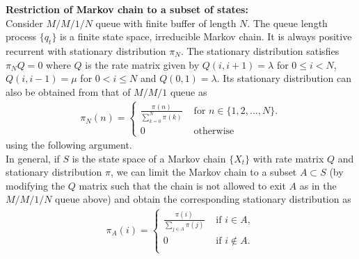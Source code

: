 \documentclass[all-lectures.tex]{subfiles}
\begin{document}
\noindent \textbf{Restriction of Markov chain to a subset of states:} \\
\indent Consider $M/M/1/N$ queue with finite buffer of length $N$. The queue length process $\{q_t\}$ is a finite state space, irreducible Markov chain. It is always positive recurrent with stationary distribution $\pi_N$. The stationary distribution satisfies $\pi_N Q = 0$ where $Q$ is the rate matrix given by $Q(i,i+1) = \lambda$ for $ 0 \leq i < N$, $Q(i,i-1) = \mu$ for $0 < i \leq N$ and $Q(0,1) = \lambda$. Its stationary distribution can also be obtained from that of $M/M/1$ queue as 
\begin{align*}
\pi_{N}(n) = \begin{cases}
	\frac{\pi_{}(n)}{\sum_{k=0}^{N} \pi_{}(k)} & \text{ for } n \in \{1,2,\dots,N\}. \\
	0 & \text{ otherwise}
	\end{cases}
\end{align*}
using the following argument. \\
\indent In general, if $S$ is the state space of a Markov chain $\{X_t\}$ with rate matrix $Q$ and stationary distribution $\pi$, we can limit the Markov chain to a subset $A \subset S$ (by modifying the $Q$ matrix such that the chain is not allowed to exit $A$ as in the $M/M/1/N$ queue above) and obtain the corresponding stationary distribution as 
\begin{align*}
\pi_A(i) = \begin{cases} 
			\frac{\pi(i)}{\sum_{j \in A} \pi(j)} & \text{ if } i \in A, \\
			0 & \text{ if } i \notin A. \\
			\end{cases}
\end{align*}
\end{document}
